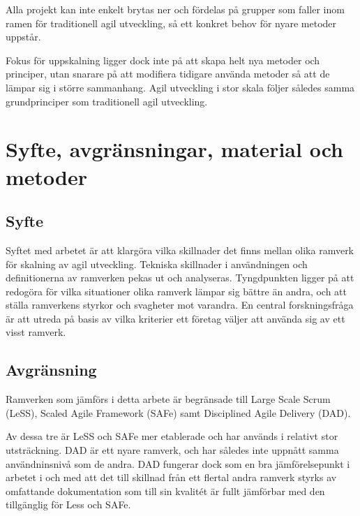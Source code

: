 		Alla projekt kan inte enkelt brytas ner och fördelas på grupper som faller inom ramen för traditionell agil utveckling, så ett konkret behov för nyare metoder uppstår.
		
		Fokus för uppskalning ligger dock inte på att skapa helt nya metoder och principer, utan snarare på att modifiera tidigare använda metoder så att de lämpar sig i större sammanhang. Agil utveckling i stor skala följer således samma grundprinciper som traditionell agil utveckling.

		
	\newpage

\section{Syfte, avgränsningar, material och metoder}
	
	
	\subsection{Syfte}
	
		Syftet med arbetet är att klargöra vilka skillnader det finns mellan olika ramverk för skalning av agil utveckling. Tekniska skillnader i användningen och definitionerna av ramverken pekas ut och analyseras.
		Tyngdpunkten ligger på att redogöra för vilka situationer olika ramverk lämpar sig bättre än andra, och att ställa ramverkens styrkor och svagheter mot varandra. \newline
		En central forskningsfråga är att utreda på basis av vilka kriterier ett företag väljer att använda sig av ett visst ramverk.
			
	
	\subsection{Avgränsning}
	
		Ramverken som jämförs i detta arbete är begränsade till Large Scale Scrum (LeSS), Scaled Agile Framework (SAFe) samt Disciplined Agile Delivery (DAD).
		
		Av dessa tre är LeSS och SAFe mer etablerade och har används i relativt stor utsträckning. DAD är ett nyare ramverk, och har således inte uppnått samma användninsnivå som de andra. DAD fungerar dock som en bra jämförelsepunkt i arbetet i och med att det till skillnad från ett flertal andra ramverk styrks av omfattande dokumentation som till sin kvalitét är fullt jämförbar med den tillgänglig för Less och SAFe.
		\cite{ask_matrix}
		
